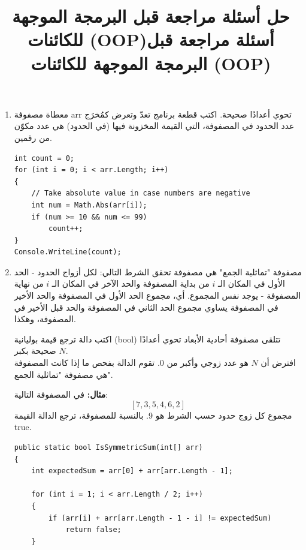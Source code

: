 \documentclass[14pt]{extarticle}
\title{حل أسئلة مراجعة قبل البرمجة الموجهة للكائنات (OOP)}
\title{أسئلة مراجعة قبل البرمجة الموجهة للكائنات (OOP)}
\begin{document}
\maketitle
\thispagestyle{fancy}

\begin{enumerate}[itemsep=3em]

\item
معطاة مصفوفة \textenglish{arr} تحوي أعدادًا صحيحة.
اكتب قطعة برنامج تعدّ وتعرض كمُخرَج عدد الحدود في المصفوفة، التي القيمة المخزونة فيها (في الحدود) هي عدد مكوّن من رقمين.

\ifwithsols
\begin{boxSolution}
\begin{english}
\begin{verbatim}
int count = 0;
for (int i = 0; i < arr.Length; i++)
{
    // Take absolute value in case numbers are negative
    int num = Math.Abs(arr[i]);
    if (num >= 10 && num <= 99)
        count++;
}
Console.WriteLine(count);
\end{verbatim}
\end{english}
\end{boxSolution}
\clearpage
\fi


\item
مصفوفة "تماثلية الجمع" هي مصفوفة تحقق الشرط التالي:
لكل أزواج الحدود - الحد الأول في المكان الـ $i$ من بداية المصفوفة والحد الآخر في المكان الـ $i$ من نهاية المصفوفة - يوجد نفس المجموع. أي، مجموع الحد الأول في المصفوفة والحد الأخير في المصفوفة يساوي مجموع الحد الثاني في المصفوفة والحد قبل الأخير في المصفوفة، وهكذا.

اكتب دالة ترجع قيمة بوليانية (\textenglish{bool}) تتلقى مصفوفة أحادية الأبعاد تحوي أعدادًا صحيحة بكبر $N$. \\
افترض أن $N$ هو عدد زوجي وأكبر من $0$. تقوم الدالة بفحص ما إذا كانت المصفوفة هي مصفوفة "تماثلية الجمع".

\textbf{مثال:} في المصفوفة التالية:
$$ [7, 3, 5, 4, 6, 2] $$
مجموع كل زوج حدود حسب الشرط هو 9. بالنسبة للمصفوفة، ترجع الدالة القيمة \textenglish{true}.

\ifwithsols
\begin{boxSolution}
\begin{english}
\begin{verbatim}
public static bool IsSymmetricSum(int[] arr)
{
    int expectedSum = arr[0] + arr[arr.Length - 1];

    for (int i = 1; i < arr.Length / 2; i++)
    {
        if (arr[i] + arr[arr.Length - 1 - i] != expectedSum)
            return false;
    }


\end{verbatim}
\end{english}
\end{boxSolution}
\end{enumerate}
\end{document}
